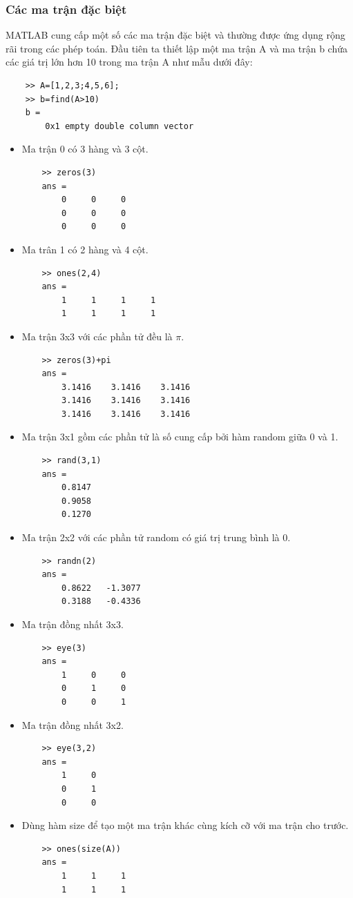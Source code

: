 \documentclass[12pt,a4paper]{article}
\begin{document}
\subsubsection{Các ma trận đặc biệt}
MATLAB cung cấp một số các ma trận đặc biệt và thường được ứng dụng rộng rãi trong các phép toán. Đầu tiên ta thiết lập một ma trận A và ma trận b chứa các giá trị lớn hơn 10 trong ma trận A như mẫu dưới đây:
\begin{lstlisting}
	>> A=[1,2,3;4,5,6];
	>> b=find(A>10)
	b =
  		0x1 empty double column vector
\end{lstlisting}
\begin{itemize}
	\item Ma trận 0 có 3 hàng và 3 cột.
\begin{lstlisting}
	>> zeros(3)
	ans =
     	0     0     0
     	0     0     0
     	0     0     0
\end{lstlisting}	
	\item Ma trân 1 có 2 hàng và 4 cột.
\begin{lstlisting}
	>> ones(2,4)
	ans =
     	1     1     1     1
     	1     1     1     1
\end{lstlisting}
	\item Ma trận 3x3 với các phần tử đều là $\pi$.
\begin{lstlisting}
	>> zeros(3)+pi
	ans =
    	3.1416    3.1416    3.1416
    	3.1416    3.1416    3.1416
    	3.1416    3.1416    3.1416
\end{lstlisting}
	\item Ma trận 3x1 gồm các phần tử là số cung cấp bởi hàm random giữa 0 và 1.
\begin{lstlisting}
	>> rand(3,1)
	ans =
    	0.8147
    	0.9058
    	0.1270
\end{lstlisting}
	\item Ma trận 2x2 với các phần tử random có giá trị trung bình là 0.
\begin{lstlisting}
	>> randn(2)
	ans =
    	0.8622   -1.3077
    	0.3188   -0.4336
\end{lstlisting}
	\item Ma trận đồng nhất 3x3.
\begin{lstlisting}
	>> eye(3)
	ans =
     	1     0     0
     	0     1     0
     	0     0     1
\end{lstlisting}
	\item Ma trận đồng nhất 3x2.
\begin{lstlisting}
	>> eye(3,2)
	ans =
     	1     0
     	0     1
     	0     0
\end{lstlisting}
	\item Dùng hàm size để tạo một ma trận khác cùng kích cỡ với ma trận cho trước.
\begin{lstlisting}
	>> ones(size(A))
	ans =
     	1     1     1
     	1     1     1
\end{lstlisting}
\end{itemize}
\end{document}
